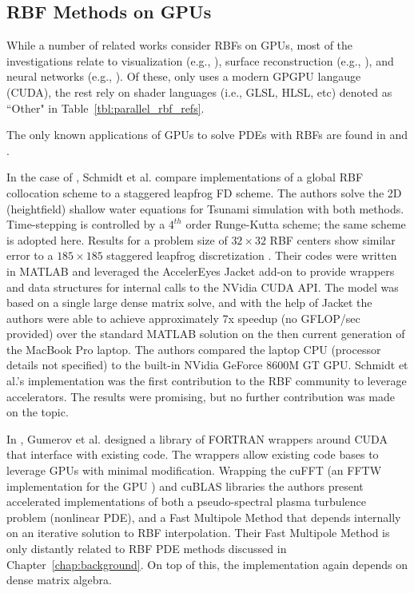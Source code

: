 \documentclass[11pt]{report}
\begin{document}
\subsection{RBF Methods on GPUs}


While a number of related works consider RBFs on GPUs, most of the investigations relate to visualization (e.g., \cite{Cuntz2007, Weiler2005}),  surface reconstruction (e.g., \cite{Corrigan2005,Carr2003}), and neural networks (e.g., \cite{Brandstetter2008}). Of these, only \cite{Cuntz2007} uses a modern GPGPU langauge (CUDA), the rest rely on shader languages (i.e., GLSL, HLSL, etc) denoted as ``Other" in Table~\ref{tbl:parallel_rbf_refs}.

The only known applications of GPUs to solve PDEs with RBFs are found in \cite{Gumerov2007a, Gumerov2007b} and \cite{Schmidt2009a, Schmidt2009b}. 

In the case of \cite{Schmidt2009a, Schmidt2009b}, Schmidt et al. compare implementations of a global RBF collocation scheme to a staggered leapfrog FD scheme. The authors solve the 2D (heightfield) shallow water equations for Tsunami simulation with both methods. Time-stepping is controlled by a $4^{th}$ order Runge-Kutta scheme; the same scheme is adopted here. Results for a problem size of $32\times32$ RBF centers show similar error to a $185\times 185$ staggered leapfrog discretization \cite{Schmidt2009b}. 
Their codes were written in MATLAB and leveraged the AccelerEyes Jacket \cite{JacketGuide2009} add-on to provide wrappers and data structures for internal calls to the NVidia CUDA API. The model was based on a single large dense matrix solve, and with the help of Jacket the authors were able to achieve approximately 7x speedup (no GFLOP/sec provided) over the standard MATLAB solution on the then current generation of the MacBook Pro laptop. The authors compared the laptop CPU (processor details not specified) to the built-in NVidia GeForce 8600M GT GPU. Schmidt et al.'s implementation was the first contribution to the RBF community to leverage accelerators. The results were promising, but no further contribution was made on the topic. 

In \cite{Gumerov2007a, Gumerov2007b}, Gumerov et al. designed a library of FORTRAN wrappers around CUDA that interface with existing code. The wrappers allow existing code bases to leverage GPUs with minimal modification. Wrapping the cuFFT (an FFTW implementation for the GPU \cite{CudaGuide2011}) and cuBLAS libraries the authors present accelerated implementations of both a pseudo-spectral plasma turbulence problem (nonlinear PDE), and a Fast Multipole Method that depends internally on an iterative solution to RBF interpolation. Their Fast Multipole Method is only distantly related to RBF PDE methods discussed in Chapter~\ref{chap:background}. On top of this, the implementation again depends on dense matrix algebra.
\end{document}
